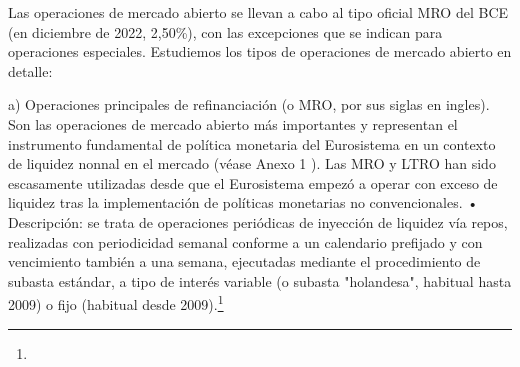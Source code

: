 \documentclass[10pt,a4paper]{article}
\begin{document}
{Las operaciones de mercado abierto se llevan a cabo al tipo oficial MRO del BCE (en diciembre de 2022, 2,50\%), con las excepciones que se indican para operaciones especiales. Estudiemos los tipos de operaciones de mercado abierto en detalle:

a) Operaciones principales de refinanciación (o MRO, por sus siglas en ingles). 
Son las operaciones de mercado abierto más importantes y representan el instrumento fundamental de política monetaria del Eurosistema en un contexto de liquidez nonnal en el mercado (véase Anexo 1 ). Las MRO y LTRO han sido escasamente utilizadas desde que el Eurosistema empezó a operar con exceso de liquidez tras la implementación de políticas monetarias no convencionales. • Descripción: se trata de operaciones periódicas de inyección de liquidez vía repos, realizadas con periodicidad semanal conforme a un calendario prefijado y con vencimiento también a una semana, ejecutadas mediante el procedimiento de subasta estándar, a tipo de interés variable (o subasta "holandesa", habitual hasta 2009) o fijo (habitual desde 2009).\footnote{%
}}
\end{document}
